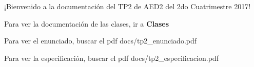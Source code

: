 ¡\+Bienvenido a la documentación del T\+P2 de A\+E\+D2 del 2do Cuatrimestre 2017!


\begin{DoxyItemize}
\item Para ver la documentación de las clases, ir a {\bfseries Clases}
\item Para ver el enunciado, buscar el pdf {\ttfamily docs/tp2\+\_\+enunciado.\+pdf}
\item Para ver la especificación, buscar el pdf {\ttfamily docs/tp2\+\_\+especificacion.\+pdf} 
\end{DoxyItemize}